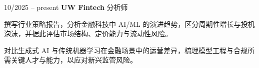 \begin{twocolentry}{10/2025 – present} \textbf{UW Fintech} 
    \newline 分析师 \end{twocolentry}
\begin{onecolentry}
\begin{highlights}
\item 撰写行业策略报告，分析金融科技中 AI/ML 的演进趋势，区分周期性增长与投机泡沫，并据此评估市场结构、定价能力与流动性风险。
\item 对比生成式 AI 与传统机器学习在金融场景中的运营差异，梳理模型工程与合规所需关键人才与能力，以应对新兴监管风险。
\end{highlights}
\end{onecolentry}
